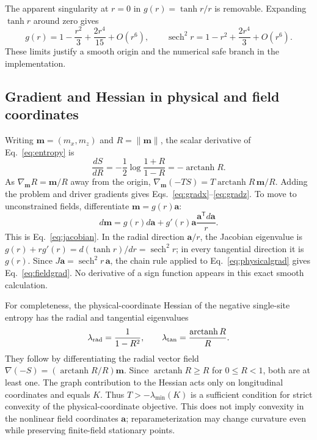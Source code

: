 The apparent singularity at $r=0$ in $g(r)=\tanh r/r$ is removable.
Expanding $\tanh r$ around zero gives
\begin{equation}
 g(r)=1-\frac{r^2}{3}+\frac{2r^4}{15}+O(r^6),
 \qquad
 \operatorname{sech}^2r=1-r^2+\frac{2r^4}{3}+O(r^6).
 \label{eq:app-series}
\end{equation}
These limits justify a smooth origin and the numerical safe branch in
the implementation.

\subsection{Gradient and Hessian in physical and field coordinates}

Writing $\bm m=(m_x,m_z)$ and $R=\|\bm m\|$, the scalar derivative of
Eq.~\eqref{eq:entropy} is
\begin{equation}
 \frac{dS}{dR}
 =-\frac12\log\frac{1+R}{1-R}
 =-\operatorname{arctanh}R.
 \label{eq:app-ds}
\end{equation}
As $\nabla_{\bm m}R=\bm m/R$ away from the origin,
$\nabla_{\bm m}(-TS)=T\operatorname{arctanh}R\,\bm m/R$.
Adding the problem and driver gradients gives
Eqs.~\eqref{eq:gradx}--\eqref{eq:gradz}. To move to unconstrained
fields, differentiate $\bm m=g(r)\bm a$:
\begin{equation}
 d\bm m=g(r)d\bm a+
   g'(r)\bm a\frac{\bm a^{\mathsf T}d\bm a}{r}.
 \label{eq:app-dm}
\end{equation}
This is Eq.~\eqref{eq:jacobian}. In the radial direction
$\bm a/r$, the Jacobian eigenvalue is
$g(r)+rg'(r)=d(\tanh r)/dr=\operatorname{sech}^2r$;
in every tangential direction it is $g(r)$. Since
$J\bm a=\operatorname{sech}^2r\,\bm a$,
the chain rule applied to Eq.~\eqref{eq:physicalgrad} gives
Eq.~\eqref{eq:fieldgrad}. No derivative of a sign function appears in
this exact smooth calculation.

For completeness, the physical-coordinate Hessian of the negative
single-site entropy has the radial and tangential eigenvalues
\begin{equation}
 \lambda_{\rm rad}=\frac{1}{1-R^2},
 \qquad
 \lambda_{\rm tan}=\frac{\operatorname{arctanh}R}{R}.
 \label{eq:app-entropy-hessian}
\end{equation}
They follow by differentiating the radial vector field
$\nabla(-S)=(\operatorname{arctanh}R/R)\bm m$. Since
$\operatorname{arctanh}R\geq R$ for $0\leq R<1$, both are at least one.
The graph contribution to the Hessian acts only on longitudinal
coordinates and equals $K$. Thus $T> -\lambda_{\min}(K)$ is a sufficient
condition for strict convexity of the physical-coordinate objective.
This does not imply convexity in the nonlinear field coordinates
$\bm a$; reparameterization may change curvature even while preserving
finite-field stationary points.

